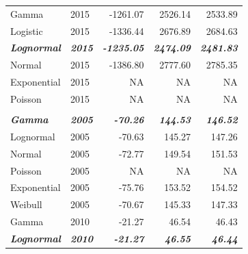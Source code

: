 \documentclass[
11pt, %
oneside, %
english, %
singlespacing, %
]{macthesis} %
\begin{document}
\begin{table}
\begin{tabular}{llrrr}
\hspace{1em}Gamma & 2015 & -1261.07 & 2526.14 & 2533.89\\
\hspace{1em}Logistic & 2015 & -1336.44 & 2676.89 & 2684.63\\
\begingroup\fontsize{9}{11}\selectfont \em{\textbf{\hspace{1em}Lognormal}}\endgroup & \begingroup\fontsize{9}{11}\selectfont \em{\textbf{2015}}\endgroup & \begingroup\fontsize{9}{11}\selectfont \em{\textbf{-1235.05}}\endgroup & \begingroup\fontsize{9}{11}\selectfont \em{\textbf{2474.09}}\endgroup & \begingroup\fontsize{9}{11}\selectfont \em{\textbf{2481.83}}\endgroup\\
\hspace{1em}Normal & 2015 & -1386.80 & 2777.60 & 2785.35\\
\hspace{1em}Exponential & 2015 & NA & NA & \vphantom{1} NA\\
\hspace{1em}Poisson & 2015 & NA & NA & \vphantom{1} NA\\
\addlinespace[0.3em]
\multicolumn{5}{l}{\textbf{Destination: Grocery store}}\\
\begingroup\fontsize{9}{11}\selectfont \em{\textbf{\hspace{1em}Gamma}}\endgroup & \begingroup\fontsize{9}{11}\selectfont \em{\textbf{2005}}\endgroup & \begingroup\fontsize{9}{11}\selectfont \em{\textbf{-70.26}}\endgroup & \begingroup\fontsize{9}{11}\selectfont \em{\textbf{144.53}}\endgroup & \begingroup\fontsize{9}{11}\selectfont \em{\textbf{146.52}}\endgroup\\
\hspace{1em}Lognormal & 2005 & -70.63 & 145.27 & 147.26\\
\hspace{1em}Normal & 2005 & -72.77 & 149.54 & 151.53\\
\hspace{1em}Poisson & 2005 & NA & NA & NA\\
\hspace{1em}Exponential & 2005 & -75.76 & 153.52 & 154.52\\
\hspace{1em}Weibull & 2005 & -70.67 & 145.33 & 147.33\\
\hspace{1em}Gamma & 2010 & -21.27 & 46.54 & 46.43\\
\begingroup\fontsize{9}{11}\selectfont \em{\textbf{\hspace{1em}Lognormal}}\endgroup & \begingroup\fontsize{9}{11}\selectfont \em{\textbf{2010}}\endgroup & \begingroup\fontsize{9}{11}\selectfont \em{\textbf{-21.27}}\endgroup & \begingroup\fontsize{9}{11}\selectfont \em{\textbf{46.55}}\endgroup & \begingroup\fontsize{9}{11}\selectfont \em{\textbf{46.44}}\endgroup\\

\end{tabular}
\end{table}
\end{document}

